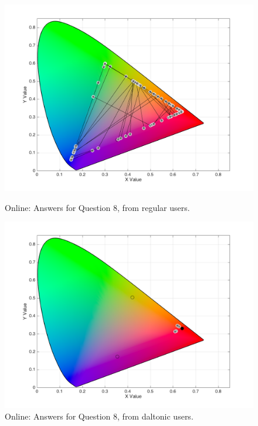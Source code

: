 \begin{figure}[!htbp]
  \centering
  \begin{minipage}{0.48\textwidth}
    \centering
    \includegraphics[width=\textwidth]{images/results/8_online_regularUsers.png}
    \caption[Online: Answers for Question 8, from regular users.]{Online: Answers for Question 8, from regular users.}
    \label{fig:dalt_1}
  \end{minipage}\hfill
  \begin{minipage}{0.48\textwidth}
    \centering
    \includegraphics[width=\textwidth]{images/results/8_online_daltonicUsers.png}
    \caption[Online: Answers for Question 8, from daltonic users.]{Online: Answers for Question 8, from daltonic users.}
    \label{fig:dalt_2}
  \end{minipage}
\end{figure} \par
%
